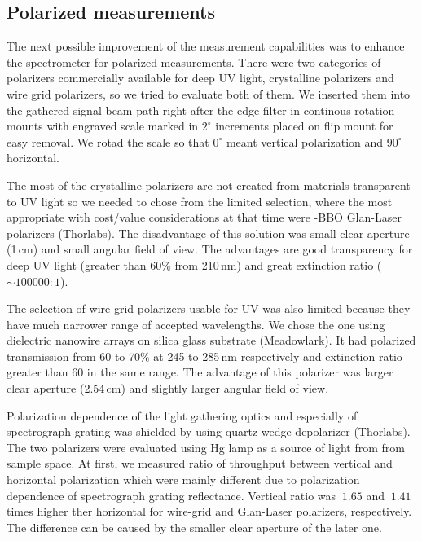 \subsection{Polarized measurements}

The next possible improvement of the measurement capabilities was to enhance
the spectrometer for polarized measurements. There were two categories of
polarizers commercially available for deep UV light, crystalline polarizers and
wire grid polarizers, so we tried to evaluate both of them. We inserted them
into the gathered signal beam path right after the edge filter in continous
rotation mounts with engraved scale marked in $2^\circ$ increments placed
on flip mount for easy removal. We rotad the scale so that $0^\circ$ meant
vertical polarization and $90^\circ$ horizontal.

The most of the crystalline polarizers are not created from materials
transparent to UV light so we needed to chose from the limited selection,
where the most appropriate with cost/value considerations at that time were
-BBO Glan-Laser polarizers (Thorlabs). The disadvantage of this solution
was small clear aperture (1\,cm) and small angular field of view. The
advantages are good transparency for deep UV light (greater than 60\% from
210\,nm) and great extinction ratio ($\sim 100000:1$).

The selection of wire-grid polarizers usable for UV was also limited because
they have much narrower range of accepted wavelengths. We chose the one using
dielectric nanowire arrays on silica glass substrate (Meadowlark). It had
polarized transmission from 60 to 70\% at 245 to 285\,nm respectively and
extinction ratio greater than 60 in the same range. The advantage of this
polarizer was larger clear aperture (2.54\,cm) and slightly larger angular
field of view.

Polarization dependence of the light gathering optics and especially of
spectrograph grating was shielded by using quartz-wedge depolarizer (Thorlabs).
The two polarizers were evaluated using Hg lamp as a source of light from
from sample space. At first, we measured ratio of throughput between vertical
and horizontal polarization which were mainly different due to polarization
dependence of spectrograph grating reflectance. Vertical ratio was $~1.65$
and $~1.41$ times higher ther horizontal for wire-grid and Glan-Laser
polarizers, respectively. The difference can be caused by the smaller clear
aperture of the later one.

